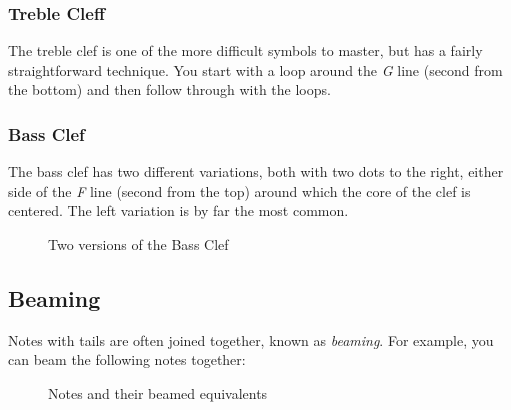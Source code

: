 \subsubsection*{Treble Cleff}

The treble clef is one of the more difficult symbols to master, but has a fairly straightforward technique. You start with a loop around the \emph{G} line (second from the bottom) and then follow through with the loops.

\begin{figure}[h!]
  \centering
  \label{fig:TrebleClef}
\end{figure}

\subsubsection*{Bass Clef}

The bass clef has two different variations, both with two dots to the right, either side of the \emph{F} line (second from the top) around which the core of the clef is centered. The left variation is by far the most common.

\begin{figure}[h!]
  \centering
  \caption{Two versions of the Bass Clef}
  \label{fig:BassClef}
\end{figure}

\subsection*{Beaming}

Notes with tails are often joined together, known as \emph{beaming}. For example, you can beam the following notes together:

\begin{figure}[h!]
  \centering
  \caption{Notes and their beamed equivalents}
  \label{fig:RestCrochetQS}
\end{figure}


